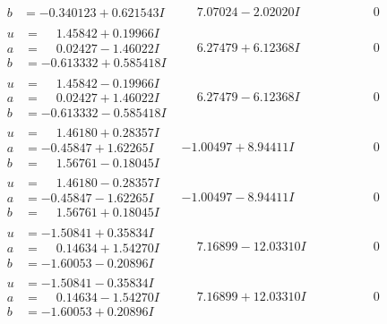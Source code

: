 \documentclass[1p]{elsarticle_modified}
\theoremstyle{definition}
\begin{document}
$$\begin{array}{c|c|c}
\begin{aligned}
b &= -0.340123 + 0.621543 I\end{aligned}
 & \phantom{-}7.07024 - 2.02020 I & \phantom{-0.000000 } 0 \\ \hline\begin{aligned}
u &= \phantom{-}1.45842 + 0.19966 I \\
a &= \phantom{-}0.02427 - 1.46022 I \\
b &= -0.613332 + 0.585418 I\end{aligned}
 & \phantom{-}6.27479 + 6.12368 I & \phantom{-0.000000 } 0 \\ \hline\begin{aligned}
u &= \phantom{-}1.45842 - 0.19966 I \\
a &= \phantom{-}0.02427 + 1.46022 I \\
b &= -0.613332 - 0.585418 I\end{aligned}
 & \phantom{-}6.27479 - 6.12368 I & \phantom{-0.000000 } 0 \\ \hline\begin{aligned}
u &= \phantom{-}1.46180 + 0.28357 I \\
a &= -0.45847 + 1.62265 I \\
b &= \phantom{-}1.56761 - 0.18045 I\end{aligned}
 & -1.00497 + 8.94411 I & \phantom{-0.000000 } 0 \\ \hline\begin{aligned}
u &= \phantom{-}1.46180 - 0.28357 I \\
a &= -0.45847 - 1.62265 I \\
b &= \phantom{-}1.56761 + 0.18045 I\end{aligned}
 & -1.00497 - 8.94411 I & \phantom{-0.000000 } 0 \\ \hline\begin{aligned}
u &= -1.50841 + 0.35834 I \\
a &= \phantom{-}0.14634 + 1.54270 I \\
b &= -1.60053 - 0.20896 I\end{aligned}
 & \phantom{-}7.16899 - 12.03310 I & \phantom{-0.000000 } 0 \\ \hline\begin{aligned}
u &= -1.50841 - 0.35834 I \\
a &= \phantom{-}0.14634 - 1.54270 I \\
b &= -1.60053 + 0.20896 I\end{aligned}
 & \phantom{-}7.16899 + 12.03310 I & \phantom{-0.000000 } 0 \\ \hline\begin{aligned}

\end{aligned}
\end{array}$$
\end{document}
